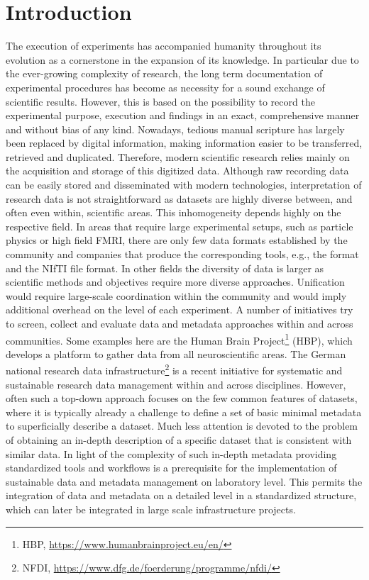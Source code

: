 \clearpage
\chapter{Introduction}
\label{sec:intro}
The execution of experiments has accompanied humanity throughout its evolution as a cornerstone in the expansion of its knowledge. In particular due to the ever-growing complexity of research, the long term documentation of experimental procedures has become as necessity for a sound exchange of scientific results. However, this is based on the possibility to record the experimental purpose, execution and findings in an exact, comprehensive manner and without bias of any kind. Nowadays, tedious manual scripture has largely been replaced by digital information, making information easier to be transferred, retrieved and duplicated. Therefore, modern scientific research relies mainly on the acquisition and storage of this digitized data. Although raw recording data can be easily stored and disseminated with modern technologies, interpretation of research data is not straightforward as datasets are highly diverse between, and often even within, scientific areas. This inhomogeneity depends highly on the respective field. In areas that require large experimental setups, such as particle physics or high field FMRI, there are only few data formats established by the community and companies that produce the corresponding tools, e.g., the  format \citep{Brun_1996} and the NIfTI file format. In other fields the diversity of data is larger as scientific methods and objectives require more diverse approaches. Unification would require large-scale coordination within the community and  would imply additional overhead on the level of each experiment. A number of initiatives try to screen, collect and evaluate data and metadata approaches within and across communities. Some examples here are the Human Brain Project\footnote{HBP, \url{https://www.humanbrainproject.eu/en/}} (HBP), which develops a platform to gather data from all neuroscientific areas. The German national research data infrastructure\footnote{NFDI, \url{https://www.dfg.de/foerderung/programme/nfdi/}} is a recent initiative for systematic and sustainable research data management within and across disciplines. However, often such a top-down approach focuses on the few common features of datasets, where it is typically already a challenge to define a set of basic minimal metadata to superficially describe a dataset. Much less attention is devoted to the problem of obtaining an in-depth description of a specific dataset that is consistent with similar data. In light of the complexity of such in-depth metadata providing standardized tools and workflows is a prerequisite for the implementation of sustainable data and metadata management on laboratory level. This permits the integration of data and metadata on a detailed level in a standardized structure, which can later be integrated in large scale infrastructure projects.\\

